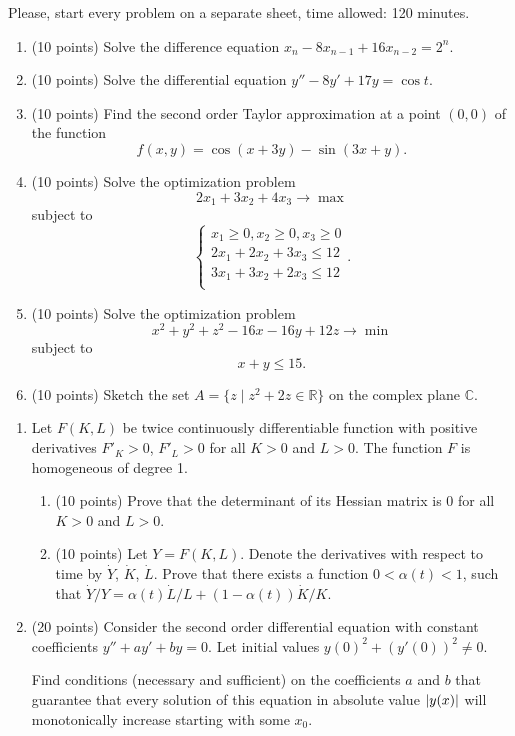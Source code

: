 \documentclass[12pt]{article} %
\theoremstyle{definition} %
\begin{document}


Please, start every problem on a separate sheet, time allowed: 120 minutes.




\begin{enumerate}
  \item (10 points) Solve the difference equation $x_n - 8 x_{n-1} + 16 x_{n-2} = 2^n$.

  \item (10 points) Solve the differential equation $y'' - 8 y' + 17 y = \cos t$.
\item (10 points) 
Find the second order Taylor approximation at a point $(0, 0)$ of the function 
\[
  f(x, y) = \cos(x + 3y) - \sin (3x + y).
\]

\item (10 points) Solve the optimization problem 
\[
2 x_1 + 3 x_2 + 4 x_3 \to \max  
\]
subject to
\[
\begin{cases}
x_1 \geq 0,  x_2 \geq 0, x_3 \geq 0  \\
2 x_1 + 2 x_2 + 3x_3 \leq 12 \\
3 x_1 + 3 x_2 + 2x_3 \leq 12 \\ 
\end{cases}.
\]

\item (10 points) Solve the optimization problem 
\[
x^2 + y^2 + z^2 - 16x - 16y + 12 z \to \min
\]
subject to
\[
x + y \leq 15. 
\]

\item (10 points) Sketch the set $A = \{z \mid z^2 + 2z \in \mathbb R\}$ on the complex plane $\mathbb C$.


\end{enumerate}

\begin{enumerate}[resume]
\item Let $F(K, L)$ be twice continuously differentiable function with positive derivatives $F'_K >0$, $F'_L > 0$ for all $K > 0$ and $L > 0$. 
The function $F$ is homogeneous of degree 1.
\begin{enumerate}
    \item (10 points) Prove that the determinant of its Hessian matrix is 0 for all $K > 0$ and $L > 0$.
    \item (10 points) Let $Y = F(K, L)$. Denote the derivatives with respect to time by $\dot Y$, $\dot K$, $\dot L$. 
    Prove that there exists a function $0 < \alpha(t) < 1$, such that 
    $\dot Y/Y = \alpha(t) \dot L/L + (1-\alpha(t)) \dot K/K$.
\end{enumerate}


\item (20 points) Consider the second order differential equation with constant coefficients $y'' + a y' + by = 0$. 
Let initial values $y(0)^2 + (y'(0))^2 \neq 0$. 

Find conditions (necessary and sufficient) on the coefficients $a$ and $b$ 
that guarantee that every solution of this equation in absolute value $\abs{y(x)}$ 
will monotonically increase starting with some $x_0$.


\end{enumerate}
\end{document}
